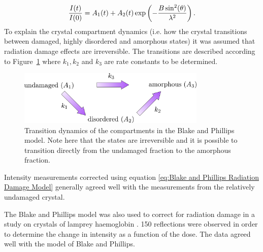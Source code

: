         \begin{equation}
            \frac{I(t)}{I(0)} = A_1(t) + A_2(t) \exp\left(-\frac{B\sin^2(\theta)}{\lambda^2} \right).
            \label{eq:Blake and Phillips Radiation Damage Model}
        \end{equation}
        To explain the crystal compartment dynamics (i.e. how the crystal transitions between damaged, highly disordered and amorphous states) it was assumed that radiation damage effects are irreversible.
        The transitions are described according to Figure~\ref{fig:Crystal Compartments Blake and Phillips} where $k_1, k_2$ and $k_3$ are rate constants to be determined.
        \begin{figure}[H]
            \centering
            \includegraphics[width=0.8\textwidth]{figures/introduction/crystalcompartments_BP.pdf}
            \caption[Transition dynamics of the compartments in the Blake and Phillips radiation damage model]{Transition dynamics of the compartments in the Blake and Phillips model.
            Note here that the states are irreversible and it is possible to transition directly from the undamaged fraction to the amorphous fraction.}
            \label{fig:Crystal Compartments Blake and Phillips}
        \end{figure}
        Intensity measurements corrected using equation \ref{eq:Blake and Phillips Radiation Damage Model} generally agreed well with the measurements from the relatively undamaged crystal.

        The Blake and Phillips model was also used to correct for radiation damage in a study on crystals of lamprey haemoglobin \cite{hendrickson1973}.
        150 reflections were observed in order to determine the change in intensity as a function of the dose.
        The data agreed well with the model of Blake and Phillips.

